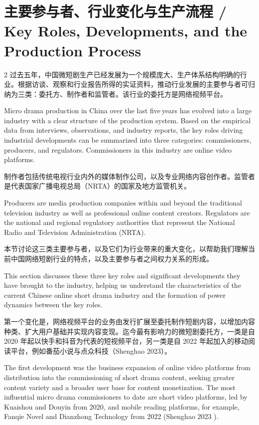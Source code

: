 \documentclass[10pt,a4paper]{article}
\begin{document}
\section*{主要参与者、行业变化与生产流程 / Key Roles, Developments, and the Production Process}
\begin{paracol}{2}
过去五年，中国微短剧生产已经发展为一个规模庞大、生产体系结构明确的行业。根据访谈、观察和行业报告所得的实证资料，推动行业发展的主要参与者可归纳为三类：委托方、制作者和监管者。该行业的委托方是网络视频平台。\par
\switchcolumn
Micro drama production in China over the last five years has evolved into a large industry with a clear structure of the production system. Based on the empirical data from interviews, observations, and industry reports, the key roles driving industrial developments can be summarized into three categories: commissioners, producers, and regulators. Commissioners in this industry are online video platforms.\par
\switchcolumn*
制作者包括传统电视行业内外的媒体制作公司，以及专业网络内容创作者。监管者是代表国家广播电视总局（NRTA）的国家及地方监管机关。\par
\switchcolumn
Producers are media production companies within and beyond the traditional television industry as well as professional online content creators. Regulators are the national and regional regulatory authorities that represent the National Radio and Television Administration (NRTA).\par
\switchcolumn*
本节讨论这三类主要参与者，以及它们为行业带来的重大变化，以帮助我们理解当前中国网络短剧行业的特点，以及主要参与者之间权力关系的形成。\par
\switchcolumn
This section discusses these three key roles and significant developments they have brought to the industry, helping us understand the characteristics of the current Chinese online short drama industry and the formation of power dynamics between the key roles.\par
\switchcolumn*
第一个变化是，网络视频平台的业务由发行扩展至委托制作短剧内容，以增加内容种类、扩大用户基础并实现内容变现。迄今最有影响力的微短剧委托方，一类是自 2020 年起以快手和抖音为代表的短视频平台，另一类是自 2022 年起加入的移动阅读平台，例如番茄小说与点众科技（Shenghao 2023）。\par
\switchcolumn
The first development was the business expansion of online video platforms from distribution into the commissioning of short drama content, seeking greater content variety and a broader user base for content monetization. The most influential micro drama commissioners to date are short video platforms, led by Kuaishou and Douyin from 2020, and mobile reading platforms, for example, Fanqie Novel and Dianzhong Technology from 2022 (Shenghao 2023 ).\par

\end{paracol}
\end{document}
